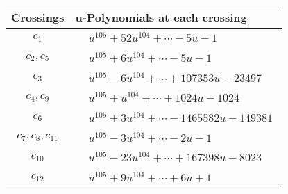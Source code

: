 \documentclass[1p]{elsarticle_modified}
\theoremstyle{definition}
\begin{document}
\begin{tabular}{m{50pt}|m{274pt}}
Crossings & \hspace{64pt}u-Polynomials at each crossing \\
\hline $$\begin{aligned}c_{1}\end{aligned}$$&$\begin{aligned}
&u^{105}+52 u^{104}+\cdots-5 u-1
\end{aligned}$\\
\hline $$\begin{aligned}c_{2},c_{5}\end{aligned}$$&$\begin{aligned}
&u^{105}+6 u^{104}+\cdots-5 u-1
\end{aligned}$\\
\hline $$\begin{aligned}c_{3}\end{aligned}$$&$\begin{aligned}
&u^{105}-6 u^{104}+\cdots+107353 u-23497
\end{aligned}$\\
\hline $$\begin{aligned}c_{4},c_{9}\end{aligned}$$&$\begin{aligned}
&u^{105}+u^{104}+\cdots+1024 u-1024
\end{aligned}$\\
\hline $$\begin{aligned}c_{6}\end{aligned}$$&$\begin{aligned}
&u^{105}+3 u^{104}+\cdots-1465582 u-149381
\end{aligned}$\\
\hline $$\begin{aligned}c_{7},c_{8},c_{11}\end{aligned}$$&$\begin{aligned}
&u^{105}-3 u^{104}+\cdots-2 u-1
\end{aligned}$\\
\hline $$\begin{aligned}c_{10}\end{aligned}$$&$\begin{aligned}
&u^{105}-23 u^{104}+\cdots+167398 u-8023
\end{aligned}$\\
\hline $$\begin{aligned}c_{12}\end{aligned}$$&$\begin{aligned}
&u^{105}+9 u^{104}+\cdots+6 u+1
\end{aligned}$\\
\hline
\end{tabular}\\~\\
\end{document}
